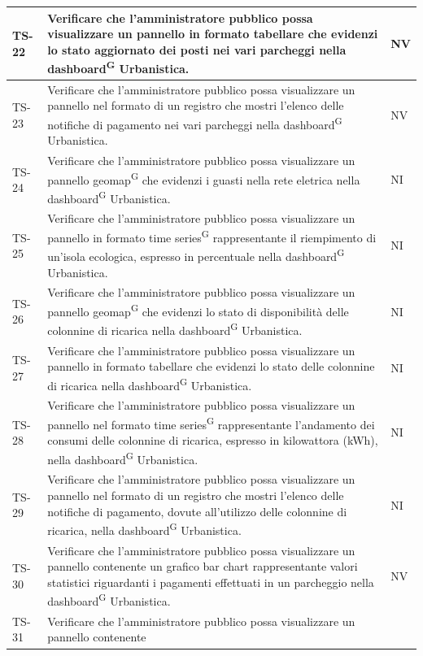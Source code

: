 \documentclass[8pt]{article}
\newcommand{\glossterm}[1]{#1\textsuperscript{G}} %
\begin{document}
\begin{longtable}{|>{\centering}p{2cm}|>{\RaggedRight}m{12cm}|>{\centering\arraybackslash}p{2cm}|}
    \hline
    TS-22 & Verificare che l'amministratore pubblico possa visualizzare un pannello in formato tabellare che evidenzi lo stato aggiornato dei posti nei vari parcheggi nella
    \glossterm{dashboard} Urbanistica. & NV \\
    \hline
    TS-23 & 
    Verificare che l'amministratore pubblico possa visualizzare un pannello nel formato di un registro che mostri l'elenco delle notifiche di pagamento nei vari parcheggi nella \glossterm{dashboard} Urbanistica.& NV \\
    \hline
    TS-24 & 
    Verificare che l'amministratore pubblico possa visualizzare un pannello \glossterm{geomap} che evidenzi i guasti nella rete eletrica nella \glossterm{dashboard} Urbanistica.& NI \\
    \hline
    TS-25 & 
    Verificare che l'amministratore pubblico possa visualizzare un pannello in formato \glossterm{time series} rappresentante il riempimento di un'isola ecologica, espresso in percentuale nella \glossterm{dashboard} Urbanistica.& NI \\
    \hline
    TS-26 & 
    Verificare che l'amministratore pubblico possa visualizzare un pannello \glossterm{geomap} che evidenzi lo stato di disponibilità delle colonnine di ricarica nella \glossterm{dashboard} Urbanistica.& NI \\
    \hline
    TS-27 & 
    Verificare che l'amministratore pubblico possa visualizzare un pannello in formato tabellare che evidenzi lo stato delle colonnine di ricarica nella \glossterm{dashboard} Urbanistica.& NI \\
    \hline
    TS-28 & 
    Verificare che l'amministratore pubblico possa visualizzare un pannello nel formato \glossterm{time series} rappresentante l'andamento dei consumi delle colonnine di ricarica, espresso in kilowattora (kWh), nella \glossterm{dashboard} Urbanistica.& NI \\
    \hline
    TS-29 & 
    Verificare che l'amministratore pubblico possa visualizzare un pannello nel formato di un registro che mostri l'elenco delle notifiche di pagamento, dovute all'utilizzo delle colonnine di ricarica, nella \glossterm{dashboard} Urbanistica.& NI \\
    \hline
    TS-30 & Verificare che l'amministratore pubblico possa visualizzare un pannello contenente
    un grafico bar chart rappresentante valori statistici riguardanti i pagamenti effettuati in un parcheggio nella \glossterm{dashboard} Urbanistica.
    & NV \\
    \hline
    TS-31 & Verificare che l'amministratore pubblico possa visualizzare un pannello contenente

\end{longtable}
\end{document}
